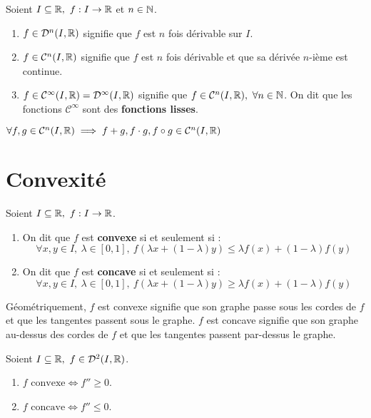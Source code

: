 \begin{definition}
	Soient $I \subseteq \mathbb{R},\ f : I \to \mathbb{R}$ et $n \in \mathbb{N}$.
	\begin{enumerate}
		\item $f \in \mathcal{D}^n(I, \mathbb{R})$ signifie que $f$ est $n$ fois dérivable sur $I$.
		\item $f \in \mathcal{C}^n(I, \mathbb{R})$ signifie que $f$ est $n$ fois dérivable et que sa dérivée $n$-ième est continue.
		\item $f \in \mathcal{C}^{\infty}(I, \mathbb{R}) = \mathcal{D}^{\infty}(I, \mathbb{R})$ signifie que $f \in \mathcal{C}^n(I, \mathbb{R}),\ \forall n \in \mathbb{N}$. On dit que les fonctions $\mathcal{C}^{\infty}$ sont des \textbf{fonctions lisses}.
	\end{enumerate}
\end{definition}

\begin{proposition}
	$\forall f, g \in \mathcal{C}^n(I, \mathbb{R}) \implies f + g, f \cdot g, f \circ g \in \mathcal{C}^n(I, \mathbb{R})$
\end{proposition}

\section{Convexité}
\begin{definition}
    Soient $I \subseteq \mathbb{R},\ f : I \to \mathbb{R}$.
    \begin{enumerate}
        \item On dit que $f$ est \textbf{convexe} si et seulement si : 
        \[ \forall x, y \in I,\ \lambda \in [0, 1],\ f(\lambda x + (1 - \lambda)y) \leq \lambda f(x) + (1 - \lambda) f(y) \]
        \item On dit que $f$ est \textbf{concave} si et seulement si : 
        \[ \forall x, y \in I,\ \lambda \in [0, 1],\ f(\lambda x + (1 - \lambda)y) \geq \lambda f(x) + (1 - \lambda) f(y) \]
    \end{enumerate}
\end{definition}

\par Géométriquement, $f$ est convexe signifie que son graphe passe sous les cordes de $f$ et que les tangentes passent sous le graphe. $f$ est concave signifie que son graphe au-dessus des cordes de $f$ et que les tangentes passent par-dessus le graphe.

\begin{theorem}
	Soient $I \subseteq \mathbb{R},\ f \in \mathcal{D}^2(I, \mathbb{R})$.
        \begin{enumerate}
                \item $f \text{ convexe} \iff f'' \geq 0$.
                \item $f \text{ concave} \iff f'' \leq 0$.
            \end{enumerate}
\end{theorem}


